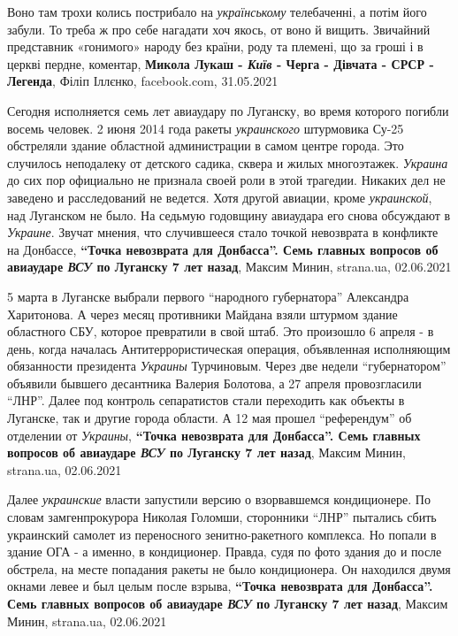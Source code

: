 Воно там трохи колись пострибало на \emph{українському} телебаченні, а потім
його забули.  То треба ж про себе нагадати хоч якось, от воно й вищить.
Звичайний представник «гонимого» народу без країни, роду та племені, що за
гроші і в церкві пердне,
коментар, \textbf{Микола Лукаш - \emph{Київ} - Черга - Дівчата - СРСР - Легенда}, Філіп Іллєнко, facebook.com, 31.05.2021

Сегодня исполняется семь лет авиаудару по Луганску, во время которого погибли
восемь человек. 2 июня 2014 года ракеты \emph{украинского} штурмовика Су-25
обстреляли здание областной администрации в самом центре города. Это случилось
неподалеку от детского садика, сквера и жилых многоэтажек.  \emph{Украина} до сих пор
официально не признала своей роли в этой трагедии. Никаких дел не заведено и
расследований не ведется. Хотя другой авиации, кроме \emph{украинской}, над Луганском
не было. На седьмую годовщину авиаудара его снова обсуждают в \emph{Украине}. Звучат
мнения, что случившееся стало точкой невозврата в конфликте на Донбассе,
\textbf{\enquote{Точка невозврата для Донбасса}. Семь главных вопросов об авиаударе \emph{ВСУ} по Луганску 7 лет назад},
Максим Минин, strana.ua, 02.06.2021

5 марта в Луганске выбрали первого \enquote{народного губернатора} Александра
Харитонова. А через месяц противники Майдана взяли штурмом здание областного
СБУ, которое превратили в свой штаб. Это произошло 6 апреля - в день, когда
началась Антитеррористическая операция, объявленная исполняющим обязанности
президента \emph{Украины} Турчиновым. Через две недели \enquote{губернатором} объявили
бывшего десантника Валерия Болотова, а 27 апреля провозгласили \enquote{ЛНР}. Далее под
контроль сепаратистов стали переходить как объекты в Луганске, так и другие
города области. А 12 мая прошел \enquote{референдум} об отделении от \emph{Украины}, 
\textbf{\enquote{Точка невозврата для Донбасса}. Семь главных вопросов об авиаударе \emph{ВСУ} по Луганску 7 лет назад},
Максим Минин, strana.ua, 02.06.2021

Далее \emph{украинские} власти запустили версию о взорвавшемся кондиционере. По словам
замгенпрокурора Николая Голомши, сторонники \enquote{ЛНР} пытались сбить
украинский самолет из переносного зенитно-ракетного комплекса. Но попали в
здание ОГА - а именно, в кондиционер. Правда, судя по фото здания до и после
обстрела, на месте попадания ракеты не было кондиционера. Он находился двумя
окнами левее и был целым после взрыва,
\textbf{\enquote{Точка невозврата для Донбасса}. Семь главных вопросов об авиаударе \emph{ВСУ} по Луганску 7 лет назад},
Максим Минин, strana.ua, 02.06.2021

